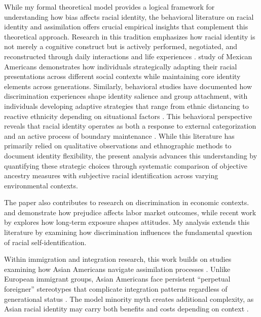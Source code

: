 While my formal theoretical model provides a logical framework for understanding how bias affects racial identity, the behavioral literature on racial identity and assimilation offers crucial empirical insights that complement this theoretical approach. Research in this tradition emphasizes how racial identity is not merely a cognitive construct but is actively performed, negotiated, and reconstructed through daily interactions and life experiences \autocite{waters1990ethnic}. \textcite{telles2008generations} study of Mexican Americans demonstrates how individuals strategically adapting their racial presentations across different social contexts while maintaining core identity elements across generations. Similarly, behavioral studies have documented how discrimination experiences shape identity salience and group attachment, with individuals developing adaptive strategies that range from ethnic distancing to reactive ethnicity depending on situational factors \autocite{zhou1997segmented}. This behavioral perspective reveals that racial identity operates as both a response to external categorization and an active process of boundary maintenance \autocite{cornell2006ethnicity}. While this literature has primarily relied on qualitative observations and ethnographic methods to document identity flexibility, the present analysis advances this understanding by quantifying these strategic choices through systematic comparison of objective ancestry measures with subjective racial identification across varying environmental contexts.

The paper also contributes to research on discrimination in economic contexts. \textcite{bertrandAreEmilyGreg2004} and \textcite{charlesPrejudiceWagesEmpirical2008} demonstrate how prejudice affects labor market outcomes, while recent work by \textcite{bursztynImmigrantNextDoor2022} explores how long-term exposure shapes attitudes. My analysis extends this literature by examining how discrimination influences the fundamental question of racial self-identification.

Within immigration and integration research, this work builds on studies examining how Asian Americans navigate assimilation processes \autocite{abramitzkyCulturalAssimilationAge2016,abramitzkyNationImmigrantsAssimilation2014}. Unlike European immigrant groups, Asian Americans face persistent ``perpetual foreigner'' stereotypes that complicate integration patterns regardless of generational status \autocite{foukaImmigrantsAmericansRace2022}. The model minority myth creates additional complexity, as Asian racial identity may carry both benefits and costs depending on context \autocite{mengIntermarriageEconomicAssimilation2005}.

